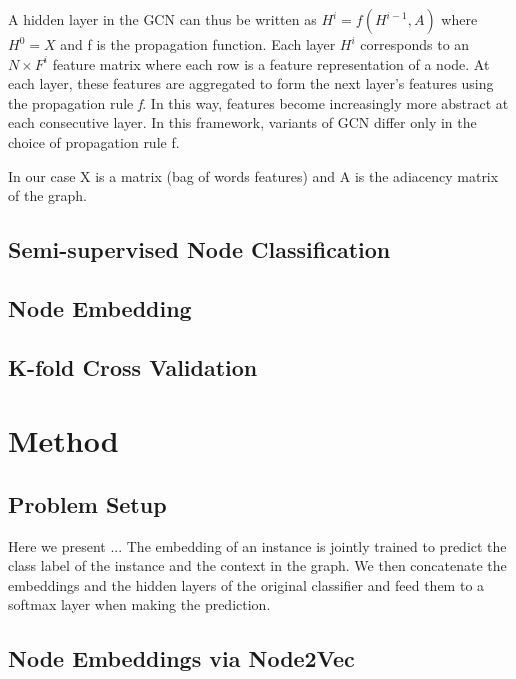 \documentclass{report}
\begin{document}
A hidden layer in the GCN can thus be written as $H^i = f(H^{i-1},A)$ where $H^0 = X$ and f is the propagation function. Each layer $H^i$ corresponds to an $N \times F^i$ feature matrix where each row is a feature representation of a node. At each layer, these features are aggregated to form the next layer’s features using the propagation rule \textit{f}. In this way, features become increasingly more abstract at each consecutive layer. In this framework, variants of GCN differ only in the choice of propagation rule f.

In our case X is a matrix (bag of words features) and A is the adiacency matrix of the graph.



\subsection{Semi-supervised Node Classification}
\subsection{Node Embedding}
\subsection{K-fold Cross Validation}

\section{Method}
\subsection{Problem Setup}
Here we present ...
The embedding of an instance is
jointly trained to predict the class label of the instance and
the context in the graph. We then concatenate the embeddings
and the hidden layers of the original classifier and
feed them to a softmax layer when making the prediction.
\subsection{Node Embeddings via Node2Vec}
\end{document}
